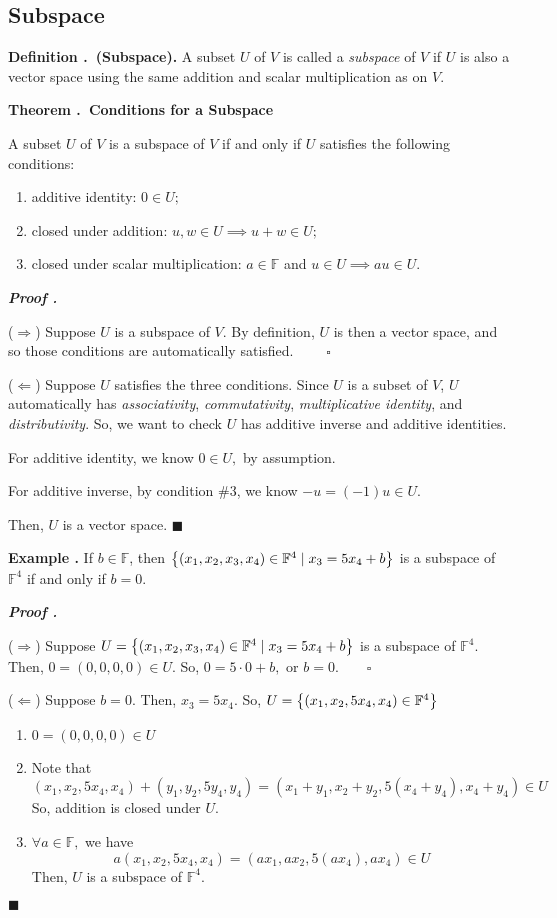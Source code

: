 \documentclass[11pt, letterpaper]{article}
\newcounter{ndf}[subsection]
\newenvironment*{df}[1]{\par\noindent\textbf{Definition \thesubsection.\stepcounter{ndf}\thendf\ (#1).}}{\par}
\newcounter{neg}[subsection]
\newenvironment*{eg}{\par\noindent\textbf{Example \thesubsection.\stepcounter{neg}\theneg}}{\par}
\newcounter{nthm}[subsection]
\newenvironment*{thm}[1]{\begin{framed}\par\noindent\textbf{Theorem \thesubsection.\stepcounter{nthm}\thenthm\ #1} \par}{\par\end{framed}}
\newcounter{nprf}[subsection]
\newenvironment*{prf}{\par\noindent\textbf{\textit{Proof \stepcounter{nprf}\thenprf.}}}{\hfill$\blacksquare$\par}
\def\F{\mathbb{F}}
\begin{document}
\subsection{Subspace}
\begin{df}{Subspace}
	A subset $U$ of $V$ is called a \textit{subspace} of $V$ if $U$ is also a vector space using the same addition and scalar multiplication as on $V$.
\end{df}
\begin{thm}{Conditions for a Subspace}
	A subset $U$ of $V$ is a subspace of $V$ if and only if $U$ satisfies the following conditions: 
	\begin{enumerate}
		\item additive identity: $0\in U;$
		\item closed under addition: $u,w\in U\implies u+w\in U;$
		\item closed under scalar multiplication: $a\in \F$ and $u\in U\implies au\in U.$
	\end{enumerate}
\end{thm}
	\begin{prf}
		\par ($\Rightarrow$) Suppose $U$ is a subspace of $V$. By definition, $U$ is then a vector space, and so those conditions are automatically satisfied. $\qquad\square$\par 
		($\Leftarrow$)	Suppose $U$ satisfies the three conditions. Since $U$ is a subset of $V$, $U$ automatically has \textit{associativity}, \textit{commutativity}, \textit{multiplicative identity}, and \textit{distributivity}. So, we want to check $U$ has additive inverse and additive identities. \par For additive identity, we know $0\in U,$ by assumption.\par For additive inverse, by condition \#3, we know $-u=(-1)u\in U.$\par Then, $U$ is a vector space. 
	\end{prf}
\begin{eg}
	If $b\in\F$, then $\qty{(x_1,x_2,x_3,x_4)\in\F^4\mid x_3=5x_4+b}$ is a subspace of $\F^4$ if and only if $b=0$.	
\end{eg}
	\begin{prf}
		\par($\Rightarrow$) Suppose $U=\qty{(x_1,x_2,x_3,x_4)\in\F^4\mid x_3=5x_4+b}$ is a subspace of $\F^4.$ Then, $0=(0,0,0,0)\in U.$ So, $0=5\cdot0+b,$ or $b=0.\qquad\square$\par 
		($\Leftarrow$) Suppose $b=0.$ Then, $x_3=5x_4.$ So, $U=\qty{(x_1,x_2,5x_4,x_4)\in\F^4}$
		\begin{enumerate}
			\item[\ding{172}] $0=(0,0,0,0)\in U$
			\item[\ding{173}] Note that \[(x_1,x_2,5x_4,x_4)+(y_1,y_2,5y_4,y_4)=(x_1+y_1,x_2+y_2,5(x_4+y_4),x_4+y_4)\in U\] So, addition is closed under $U$.
			\item[\ding{174}] $\forall a\in\F,$ we have \[a(x_1,x_2,5x_4,x_4)=(ax_1, ax_2, 5(ax_4), ax_4)\in U\] Then, $U$ is a subspace of $\F^4.$
		\end{enumerate}
	\end{prf}
\end{document}
